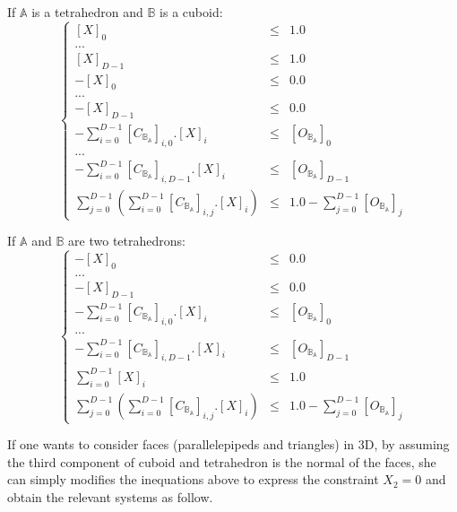 \documentclass[12pt, a4paper]{article}
\begin{document}
If $\mathbb{A}$ is a tetrahedron and $\mathbb{B}$ is a cuboid:
\begin{equation}
\left\lbrace
\begin{array}{rcl}
\left[X\right]_0&\le&1.0\\
...\\
\left[X\right]_{D-1}&\le&1.0\\
-\left[X\right]_0&\le&0.0\\
...\\
-\left[X\right]_{D-1}&\le&0.0\\
-\sum_{i=0}^{D-1}\left[C_{\mathbb{B}_\mathbb{A}}\right]_{i,0}.\left[X\right]_i&\le&\left[O_{\mathbb{B}_\mathbb{A}}\right]_0\\
...\\
-\sum_{i=0}^{D-1}\left[C_{\mathbb{B}_\mathbb{A}}\right]_{i,D-1}.\left[X\right]_i&\le&\left[O_{\mathbb{B}_\mathbb{A}}\right]_{D-1}\\
\sum_{j=0}^{D-1}\left(\sum_{i=0}^{D-1}\left[C_{\mathbb{B}_\mathbb{A}}\right]_{i,j}.\left[X\right]_i\right)&\le&1.0-\sum_{j=0}^{D-1}\left[O_{\mathbb{B}_\mathbb{A}}\right]_j
\end{array}
\right.
\end{equation}

If $\mathbb{A}$ and $\mathbb{B}$ are two tetrahedrons:
\begin{equation}
\left\lbrace
\begin{array}{rcl}
-\left[X\right]_0&\le&0.0\\
...\\
-\left[X\right]_{D-1}&\le&0.0\\
-\sum_{i=0}^{D-1}\left[C_{\mathbb{B}_\mathbb{A}}\right]_{i,0}.\left[X\right]_i&\le&\left[O_{\mathbb{B}_\mathbb{A}}\right]_0\\
...\\
-\sum_{i=0}^{D-1}\left[C_{\mathbb{B}_\mathbb{A}}\right]_{i,D-1}.\left[X\right]_i&\le&\left[O_{\mathbb{B}_\mathbb{A}}\right]_{D-1}\\
\sum_{i=0}^{D-1}\left[X\right]_i&\le&1.0\\
\sum_{j=0}^{D-1}\left(\sum_{i=0}^{D-1}\left[C_{\mathbb{B}_\mathbb{A}}\right]_{i,j}.\left[X\right]_i\right)&\le&1.0-\sum_{j=0}^{D-1}\left[O_{\mathbb{B}_\mathbb{A}}\right]_j
\end{array}
\right.
\end{equation}

If one wants to consider faces (parallelepipeds and triangles) in 3D, by assuming the third component of cuboid and tetrahedron is the normal of the faces, she can simply modifies the inequations above to express the constraint $X_2=0$ and obtain the relevant systems as follow.
\end{document}
